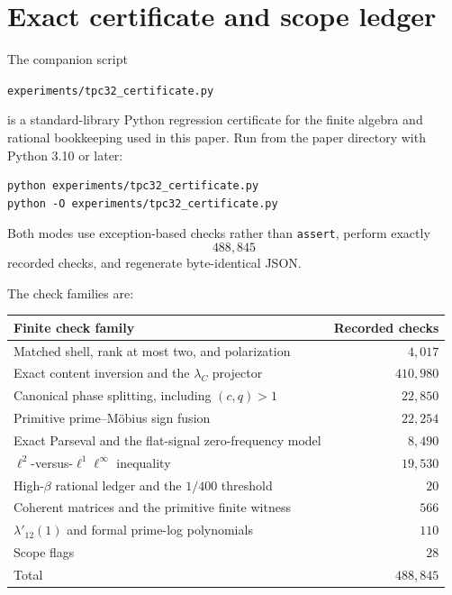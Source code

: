 \section{Exact certificate and scope ledger}
\label{sec:tpc32-certificate}

The companion script
\begin{center}
\texttt{experiments/tpc32\_certificate.py}
\end{center}
is a standard-library Python regression certificate for the finite algebra
and rational bookkeeping used in this paper.  Run from the paper directory
with Python 3.10 or later:
\begin{verbatim}
python experiments/tpc32_certificate.py
python -O experiments/tpc32_certificate.py
\end{verbatim}
Both modes use exception-based checks rather than \texttt{assert}, perform
exactly
\begin{equation}
 \boxed{488{,}845}
 \label{eq:tpc32-certificate-count}
\end{equation}
recorded checks, and regenerate byte-identical JSON.

The check families are:
\begin{center}
\begin{tabular}{@{}lr@{}}
\toprule
Finite check family & Recorded checks \\
\midrule
Matched shell, rank at most two, and polarization & $4{,}017$ \\
Exact content inversion and the \(\lambda_C\) projector & $410{,}980$ \\
Canonical phase splitting, including \((c,q)>1\) & $22{,}850$ \\
Primitive prime--M\"obius sign fusion & $22{,}254$ \\
Exact Parseval and the flat-signal zero-frequency model & $8{,}490$ \\
\(\ell^2\)-versus-\(\ell^1\ell^\infty\) inequality & $19{,}530$ \\
High-\(\beta\) rational ledger and the \(1/400\) threshold & $20$ \\
Coherent matrices and the primitive finite witness & $566$ \\
\(\lambda'_{12}(1)\) and formal prime-log polynomials & $110$ \\
Scope flags & $28$ \\
\midrule
Total & $488{,}845$ \\
\bottomrule
\end{tabular}
\end{center}

